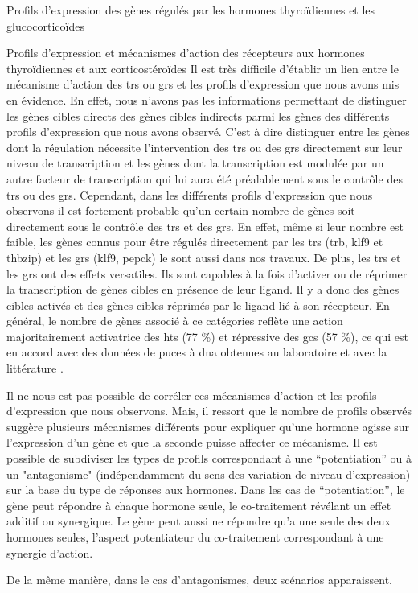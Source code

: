 \documentclass[../main.tex]{subfiles}
\begin{document}
\begin{chapter}{Profils d'expression des gènes régulés par les hormones thyroïdiennes et les glucocorticoïdes}
\begin{section}{Profils d'expression et mécanismes d'action des récepteurs aux hormones thyroïdiennes et aux corticostéroïdes}
Il est très difficile d'établir un lien entre le mécanisme d'action des \glspl{tr} ou \glspl{gr} et les profils d'expression que nous avons mis en évidence.
En effet, nous n'avons pas les informations permettant de distinguer les gènes cibles directs des gènes cibles indirects parmi les gènes des différents profils d'expression que nous avons observé.
C'est à dire distinguer entre les gènes dont la régulation nécessite l'intervention des \glspl{tr} ou des \glspl{gr} directement sur leur niveau de transcription et les gènes dont la transcription est modulée par un autre facteur de transcription qui lui aura été préalablement sous le contrôle des \glspl{tr} ou des \glspl{gr}.
Cependant, dans les différents profils d'expression que nous observons il est fortement probable qu'un certain nombre de gènes soit directement sous le contrôle des \glspl{tr} et des \glspl{gr}.
En effet, même si leur nombre est faible, les gènes connus pour être régulés directement par les \glspl{tr} (\gls{trb}, \gls{klf9} et \gls{thbzip}) et les \glspl{gr} (\gls{klf9}, \gls{pepck}) le sont aussi dans nos travaux.
De plus, les \glspl{tr} et les \glspl{gr} ont des effets versatiles.
Ils sont capables à la fois d'activer ou de réprimer la transcription de gènes cibles en présence de leur ligand.
Il y a donc des gènes cibles activés et des gènes cibles réprimés par le ligand lié à son récepteur.
En général, le nombre de gènes associé à ce catégories reflète une action majoritairement activatrice des \glspl{ht} (77 \%) et répressive des \glspl{gc} (57 \%), ce qui est en accord avec des données de puces à \gls{dna} obtenues au laboratoire et avec la littérature \citep{Wang1993}.
\par
Il ne nous est pas possible de corréler ces mécanismes d'action et les profils d'expression que nous observons.
Mais, il ressort que le nombre de profils observés suggère plusieurs mécanismes différents pour expliquer qu'une hormone agisse sur l'expression d'un gène et que la seconde puisse affecter ce mécanisme.
Il est possible de subdiviser les types de profils correspondant à une ``potentiation'' ou à un "antagonisme" (indépendamment du sens des variation de niveau d'expression) sur la base du type de réponses aux hormones.
Dans les cas de ``potentiation'', le gène peut répondre à chaque hormone seule, le co-traitement révélant un effet additif ou synergique.
Le gène peut aussi ne répondre qu'a une seule des deux hormones seules, l'aspect potentiateur du co-traitement correspondant à une synergie d'action.
\par
De la même manière, dans le cas d'antagonismes, deux scénarios apparaissent.

\end{section}
\end{chapter}
\end{document}
